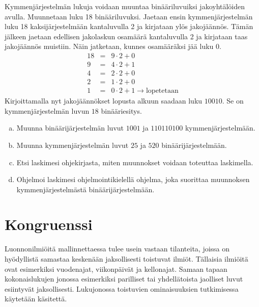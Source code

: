 \begin{enumerate}
Kymmenjärjestelmän lukuja voidaan muuntaa binääriluvuiksi jakoyhtälöiden avulla. Muunnetaan luku 18 binääriluvuksi. Jaetaan ensin kymmenjärjestelmän luku 18 kaksijärjestelmään kantaluvulla 2 ja kirjataan ylös jakojäännös. Tämän jälkeen jaetaan edellisen jakolaskun osamäärä kantaluvulla 2 ja kirjataan taas jakojäännös muistiin. Näin jatketaan, kunnes osamääräksi jää luku 0. 
\begin{eqnarray*}
18&=&9\cdot 2+0\\
9&=&4\cdot 2+1\\
4&=&2\cdot 2+0\\
2&=&1\cdot 2+0\\
1&=&0\cdot2+1 \to \textrm{lopetetaan}
\end{eqnarray*}
Kirjoittamalla nyt jakojäännökset lopusta alkuun saadaan luku $10010$. Se on kymmenjärjestelmän luvun $18$ binääriesitys.
\begin{enumerate}[a)]
\item Muunna binäärijärjestelmän luvut $1001$ ja $110110100$ kymmenjärjestelmään.
\item Muunna kymmenjärjestelmän luvut $25$ ja $520$ binäärijärjestelmään.
\item Etsi laskimesi ohjekirjasta, miten muunnokset voidaan toteuttaa laskimella.
\item Ohjelmoi laskimesi ohjelmointikielellä ohjelma, joka suorittaa muunnoksen kymmenjärjestelmästä binäärijärjestelmään.
\end{enumerate}

\end{enumerate}




\newpage


\section{Kongruenssi} 
Luonnonilmiöitä mallinnettaessa tulee usein vastaan tilanteita, joissa on hyödyllistä samastaa keskenään jaksollisesti toistuvat ilmiöt. Tällaisia ilmiöitä ovat esimerkiksi vuodenajat, viikonpäivät ja kellonajat. Samaan tapaan kokonaislukujen jonossa esimerkiksi parilliset tai yhdellätoista jaolliset luvut esiintyvät jaksollisesti. Lukujonossa toistuvien ominaisuuksien tutkimisessa käytetään  käsitettä.

